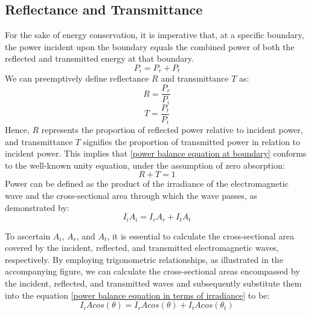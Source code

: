 \subsection{Reflectance and Transmittance}
For the sake of energy conservation, it is imperative that, at a specific boundary, the power incident upon the boundary equals the combined power of both the reflected and transmitted energy at that boundary.
\begin{equation} \label{power balance equation at boundary}
P_i = P_r + P_t
\end{equation}
We can preemptively define reflectance $R$ and transmittance $T$ as:
\begin{equation} \label{Reflectance}
R = \frac{P_r}{P_i}
\end{equation}
\begin{equation} \label{Transmittance}
T = \frac{P_t}{P_i}
\end{equation}
Hence, $R$ represents the proportion of reflected power relative to incident power, and transmittance $T$ signifies the proportion of transmitted power in relation to incident power. This implies that \ref{power balance equation at boundary} conforms to the well-known unity equation, under the assumption of zero absorption:
\begin{equation} \label{R+T=1}
R + T = 1
\end{equation}
Power can be defined as the product of the irradiance of the electromagnetic wave and the cross-sectional area through which the wave passes, as demonstrated by:
\begin{equation} \label{power balance equation in terms of irradiance}
I_iA_i = I_rA_r + I_tA_t
\end{equation}

To ascertain $A_i$, $A_r$, and $A_t$, it is essential to calculate the cross-sectional area covered by the incident, reflected, and transmitted electromagnetic waves, respectively. By employing trigonometric relationships, as illustrated in the accompanying figure, we can calculate the cross-sectional areas encompassed by the incident, reflected, and transmitted waves and subsequently substitute them into the equation \ref{power balance equation in terms of irradiance} to be:
\begin{equation} \label{power balance equations after CSA substitution}
I_iAcos(\theta) = I_rAcos(\theta) + I_tAcos(\theta_t)
\end{equation}

